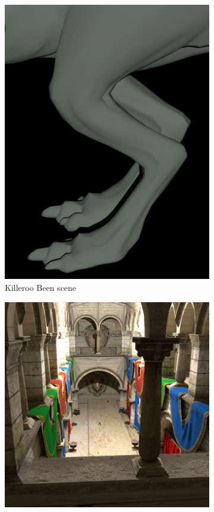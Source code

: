 \begin{figure}
  \begin{subfigure}[t]{0.25\textwidth}
    \centering
    \includegraphics[width=0.6\linewidth]{img/killerooFeet}
    \caption{Killeroo Been scene}
    \label{fig:results-scene-killeroo-been}    
  \end{subfigure}
  \begin{subfigure}[t]{0.20\textwidth}
    \centering
    \includegraphics[width=1\linewidth]{img/sponza}

\end{subfigure}
\end{figure}
